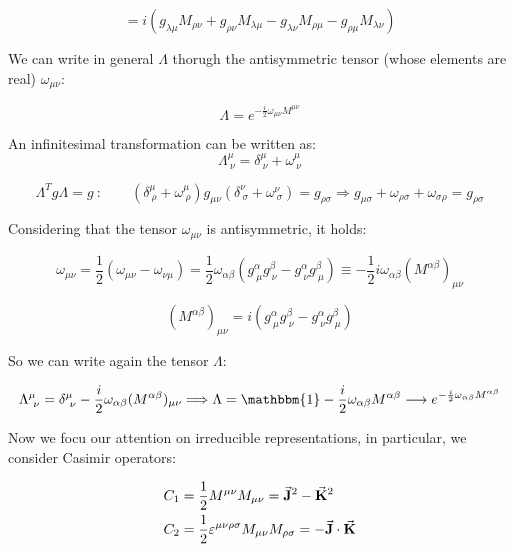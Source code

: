 \documentclass[../../main/main.tex]{subfiles}
\begin{document}
\begin{equation}
    [M_{\mu \nu }, M_{\lambda \rho }] =
    i (
    g_{\lambda \mu } M_{\rho \nu } + g_{\rho \nu } M_{\lambda \mu}
    - g_{\lambda \nu } M_{\rho \mu } - g_{\rho \mu} M_{\lambda \nu }
    )
    \label{eq:}
\end{equation}

We can write in general \( \Lambda \) thorugh the antisymmetric tensor (whose elements are real) \( \omega _{\mu \nu } \):

\[
    \Lambda = e^{-\frac{i}{2} \omega _{\mu \nu } M^{\mu \nu }}
\]

An infinitesimal transformation can be written as:
\[
    \Lambda^{\mu}_{\ \nu } = \delta^{\mu }_{\ \nu} + \omega ^{\mu }_{\ \nu }
\]

\[
    \Lambda ^T g \Lambda = g \ :
    \qquad
    (\delta^{\mu }_{\ \rho} + \omega ^{\mu }_{\ \rho })
    g_{\mu \nu}
    (\delta^{\nu }_{\ \sigma} + \omega ^{\nu }_{\ \sigma })
    =
    g_{\rho \sigma}
    \Longrightarrow
    g_{\mu \sigma } + \omega _{\rho \sigma } + \omega _{\sigma \rho } = g_{\rho \sigma}
\]

Considering that the tensor \( \omega_{\mu \nu} \) is antisymmetric, it holds:

\[
    \omega_{\mu \nu} = \frac{1}{2} (\omega_{\mu \nu} - \omega_{\nu \mu})
    =
    \frac{1}{2} \omega _{\alpha \beta} (g^{\alpha}_{\ \mu } g^{\beta}_{\ \nu} - g^{\alpha}_{\ \nu } g^{\beta}_{\ \mu})
    \equiv
    - \frac{1}{2} i \omega _{\alpha \beta} (M^{\alpha \beta})_{\mu \nu}
\]

\begin{equation}
    (M^{\alpha \beta})_{\mu \nu} =
    i (g^{\alpha}_{\ \mu } g^{\beta}_{\ \nu} - g^{\alpha}_{\ \nu } g^{\beta}_{\ \mu})
    \label{eq:}
\end{equation}

So we can write again the tensor \( \Lambda \):

\[
    \Lambda^{\mu}_{\ \nu} = \delta^{\mu}_{\ \nu} - \frac{i}{2} \omega_{\alpha \beta } (M^{\alpha \beta})_{\mu \nu}
    \Longrightarrow
    \Lambda = \mathbbm{1} - \frac{i}{2} \omega_{\alpha \beta } M^{\alpha \beta}
    \longrightarrow
    e^{-\frac{i}{2} \omega_{\alpha \beta } M^{\alpha \beta}}
\]

Now we focu our attention on irreducible representations, in particular, we consider Casimir operators:

\begin{subequations}
    \begin{align}
        C_1 &= \frac{1}{2} M^{\mu \nu } M_{\mu \nu } = \va{J} ^2 - \va{K} ^2    \\
        C_2 &= \frac{1}{2} \varepsilon ^{\mu \nu \rho \sigma} M_{\mu \nu } M_{\rho \sigma } = - \va{J} \cdot \va{K}
    \end{align}
    \label{}
\end{subequations}
\end{document}
